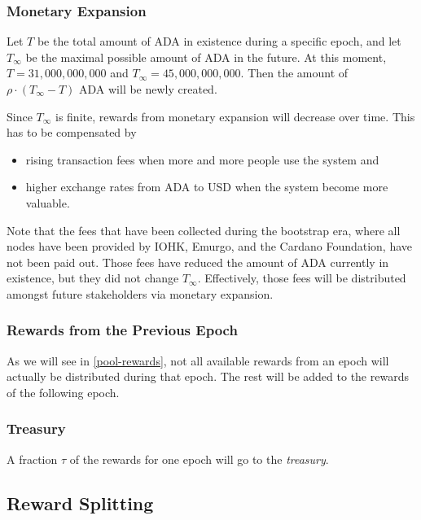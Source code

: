 \documentclass[11pt,a4paper]{article}
\begin{document}
\subsubsection{Monetary Expansion}
\label{monetary-expansion}

Let \(T\) be the total amount of ADA in existence during a specific
epoch, and let \(T_\infty\) be the maximal possible amount of ADA in the
future. At this moment, \(T=31,000,000,000\) and
\(T_\infty=45,000,000,000\). Then the amount of
\(\rho\cdot(T_\infty - T)\) ADA will be newly created.

Since \(T_\infty\) is finite, rewards from monetary expansion will
decrease over time. This has to be compensated by

\begin{itemize}
\item
  rising transaction fees when more and more people use the system and
\item
  higher exchange rates from ADA to USD when the system become more
  valuable.
\end{itemize}

Note that the fees that have been collected during the bootstrap era,
where all nodes have been provided by IOHK, Emurgo, and the Cardano
Foundation, have not been paid out. Those fees have reduced the amount
of ADA currently in existence, but they did not change
\(T_\infty\). Effectively, those fees will be distributed amongst
future stakeholders via monetary expansion.

\subsubsection{Rewards from the Previous Epoch}
\label{rewards-from-the-previous-epoch}

As we will see in \cref{pool-rewards}, not all available rewards
from an epoch will actually be distributed during that epoch. The rest
will be added to the rewards of the following epoch.

\subsubsection{Treasury}
\label{treasury}

A fraction \(\tau\) of the rewards for one epoch will go to the
\emph{treasury}.

\subsection{Reward Splitting}
\label{reward-splitting}
\end{document}
